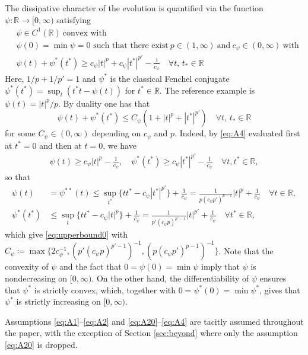 \documentclass[10pt,a4paper]{amsart}
\newcommand{\Rz}{\mathbb{R}}
\begin{document}
The dissipative character of the evolution is quantified via  the function $\psi:\Rz \to [0,\infty)$ satisfying 
\begin{align}
  &\psi\in C^1(\Rz) \ \text{convex  with}\nonumber\\[2mm]
  &\text{$\psi(0) = \min\psi =0$ such that there exist} \  p\in(1,\infty)  \ \text{and} \ c_\psi\in(0,\infty) \
    \text{with}  \nonumber\\
  &\psi(t)+\psi^*(t^*) \geq c_\psi |t|^p+c_\psi |t^*|^{p'}-\frac{1}{c_\psi}\quad \forall t,\, t_*
 \in \Rz
  \label{eq:A4}
\end{align}
Here, $1/p+1/p'=1$ and $\psi^*$ is the classical Fenchel conjugate $\psi^*(t^*)= \sup_t(
t^*t-\psi(t))$ for $t^*\in \Rz$.  The reference example is
$\psi(t) =|t|^p/p$.  By duality one has that 
\begin{equation} \psi(t)+\psi^*( t^*) \leq C_\psi(1+ |t|^p+|t^*|^{p'})\quad \forall t,\, t_*
\in \Rz\label{eq:upperbound0}
\end{equation}
for some $C_\psi\in(0,\infty)$ depending on $c_\psi$ and $p$.  Indeed, by \eqref{eq:A4} evaluated first at $t^*=0$ and then at $t=0$, we have
\begin{align*}
    \psi(t) \ge c_\psi |t|^p - \frac{1}{c_\psi}, \quad 
    \psi^*(t^*) \ge c_\psi |t^*|^{p'} - \frac{1}{c_\psi} \quad \forall t,t^* \in \Rz,
\end{align*}
so that
\begin{align*}
    \psi(t) &= \psi^{**}(t) \le \sup_{t^*} \{tt^* -c_\psi |t^*|^{p'}\} + \frac{1}{c_\psi} = \frac{1}{p(c_\psi p')^{p-1}} |t|^p + \frac{1}{c_\psi} \quad \forall t \in \Rz,
    \\
    \psi^*(t^*) & \le \sup_{ t } \{tt^* -c_\psi |t|^{p}\} + \frac{1}{c_\psi} = \frac{1}{p'(c_\psi p)^{p'-1}} |t|^{p'} + \frac{1}{c_\psi} \quad \forall t^* \in \Rz,
\end{align*}
which give \eqref{eq:upperbound0} with $C_\psi\coloneqq \max\{ 2c_\psi^{-1}, (p'(c_\psi p)^{p'-1})^{-1}, (p(c_\psi p')^{p-1})^{-1}\}$.  Note that  the
convexity of $\psi$ and the fact that $0=\psi(0)=\min \psi$ imply that
$\psi$ is nondecreasing on $[0,\infty)$. On the other hand, the
differentiability of $\psi$ ensures that $\psi^*$ is strictly convex,
which, together with $0=\psi^*(0)=\min\psi^*$, gives that $\psi^*$ is
strictly increasing on $[0,\infty)$.

 Assumptions \eqref{eq:A1}--\eqref{eq:A2} and
\eqref{eq:A20}--\eqref{eq:A4} are tacitly assumed  throughout   the paper,
with the exception of Section \ref{sec:beyond} where only the assumption \eqref{eq:A20} is dropped. 
\end{document}
